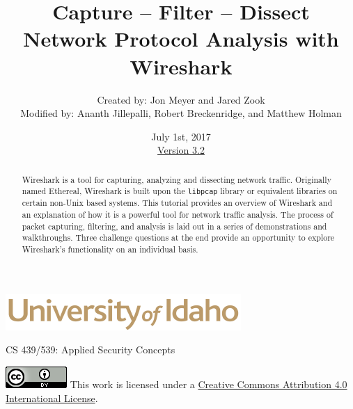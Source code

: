 \documentclass[12pt]{extarticle}
\begin{document}
	\title{ Capture -- Filter -- Dissect \\ \large Network Protocol Analysis with Wireshark}
	\author{Created by: Jon Meyer and Jared Zook\\
			Modified by: Ananth Jillepalli, Robert Breckenridge, and Matthew Holman}
	\date{July 1st, 2017 \\ \hyperref[changelog]{Version 3.2}}
	\renewcommand{\abstractname}{Summary}
	\begin{titlepage}
		\maketitle
		\begin{center}
			\includegraphics[scale=.5]{UofI}
			
			\large{CS 439/539: Applied Security Concepts}
			
			\vskip 40pt
		\end{center}
		\begin{abstract}
			Wireshark is a tool for capturing, analyzing and dissecting network traffic. Originally named Ethereal, Wireshark is built upon the \texttt{libpcap} library or equivalent libraries on certain non-Unix based systems. This tutorial provides an overview of Wireshark and an explanation of how it is a powerful tool for network traffic analysis. The process of packet capturing, filtering, and analysis is laid out in a series of demonstrations and walkthroughs. Three challenge questions at the end provide an opportunity to explore Wireshark's functionality on an individual basis.
		\end{abstract}
		\vfill
		\begin{center}
			\includegraphics[scale=0.5]{cc}
			\vskip 10pt
			This work is licensed under a \href{https://creativecommons.org/licenses/by/4.0/}{Creative Commons Attribution 4.0 International License}.
		\end{center}
	\end{titlepage}
	
	
	\pagebreak
	\tableofcontents
	
	
\end{document}
